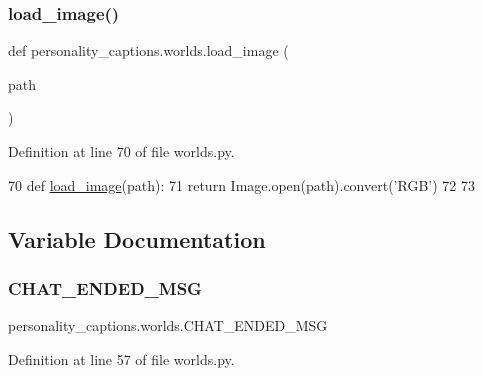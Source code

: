\subsubsection{\texorpdfstring{load\+\_\+image()}{load\_image()}}
{\footnotesize\ttfamily def personality\+\_\+captions.\+worlds.\+load\+\_\+image (\begin{DoxyParamCaption}\item[{}]{path }\end{DoxyParamCaption})}



Definition at line 70 of file worlds.\+py.


\begin{DoxyCode}
70 \textcolor{keyword}{def }\hyperlink{namespacepersonality__captions_1_1worlds_a2863737d97a8e8c5a1ebe9029d0d2293}{load\_image}(path):
71     \textcolor{keywordflow}{return} Image.open(path).convert(\textcolor{stringliteral}{'RGB'})
72 
73 
\end{DoxyCode}


\subsection{Variable Documentation}
\mbox{\label{namespacepersonality__captions_1_1worlds_ab5f20ce3940daeff015b65b3685165ed}} 
\subsubsection{\texorpdfstring{C\+H\+A\+T\+\_\+\+E\+N\+D\+E\+D\+\_\+\+M\+SG}{CHAT\_ENDED\_MSG}}
{\footnotesize\ttfamily personality\+\_\+captions.\+worlds.\+C\+H\+A\+T\+\_\+\+E\+N\+D\+E\+D\+\_\+\+M\+SG}



Definition at line 57 of file worlds.\+py.

\mbox{\label{namespacepersonality__captions_1_1worlds_a99bd89bff3bd5eff96f3dbb924374496}} 
